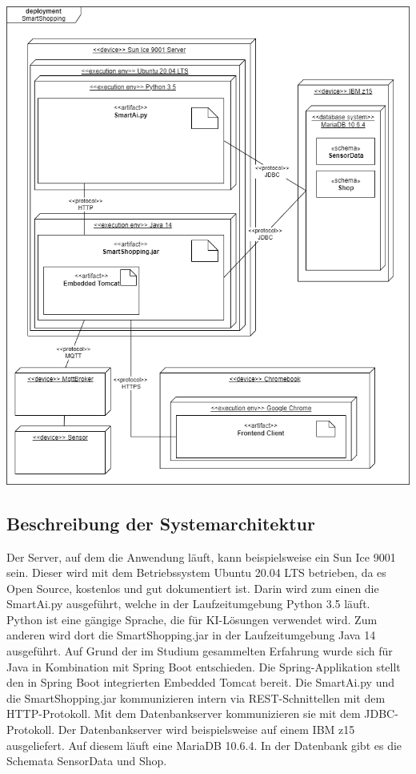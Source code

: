 \documentclass[runningheads]{llncs}
\begin{document}
\includegraphics[width=\linewidth]{images/deployment_diagram}


\subsection{Beschreibung der Systemarchitektur}


Der Server, auf dem die Anwendung läuft, kann beispielsweise ein Sun Ice 9001 sein.
Dieser wird mit dem Betriebssystem Ubuntu 20.04 LTS betrieben, da es Open Source, kostenlos und gut dokumentiert ist.
Darin wird zum einen die SmartAi.py ausgeführt, welche in der Laufzeitumgebung Python 3.5 läuft. 
Python ist eine gängige Sprache, die für KI-Lösungen verwendet wird.
Zum anderen wird dort die SmartShopping.jar in der Laufzeitumgebung Java 14 ausgeführt.
Auf Grund der im Studium gesammelten Erfahrung wurde sich für Java in Kombination mit Spring Boot entschieden.
Die Spring-Applikation stellt den in Spring Boot integrierten Embedded Tomcat bereit.
Die SmartAi.py und die SmartShopping.jar kommunizieren intern via REST-Schnittellen mit dem HTTP-Protokoll.
Mit dem Datenbankserver kommunizieren sie mit dem JDBC-Protokoll.
Der Datenbankserver wird beispielsweise auf einem IBM z15 ausgeliefert.
Auf diesem läuft eine MariaDB 10.6.4.
In der Datenbank gibt es die Schemata SensorData und Shop.
\end{document}
